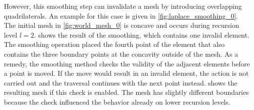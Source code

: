 However, this smoothing step can invalidate a mesh by introducing overlapping quadrilaterals. An example for this case is given in \cref{fig:laplace_smoothing_0}. The initial mesh in \cref{fig:world_mesh_0} is concave and occurs during recursion level $l=2$.  shows the result of the smoothing, which contains one invalid element. The smoothing operation placed the fourth point of the element that also contains the three boundary points at the concavity outside of the mesh. As a remedy, the smoothing method checks the validity of the adjacent elements before a point is moved. If the move would result in an invalid element, the action is not carried out and the traversal continues with the next point instead.
 shows the resulting mesh if this check is enabled. The mesh has slightly different boundaries because the check influenced the behavior already on lower recursion levels.


